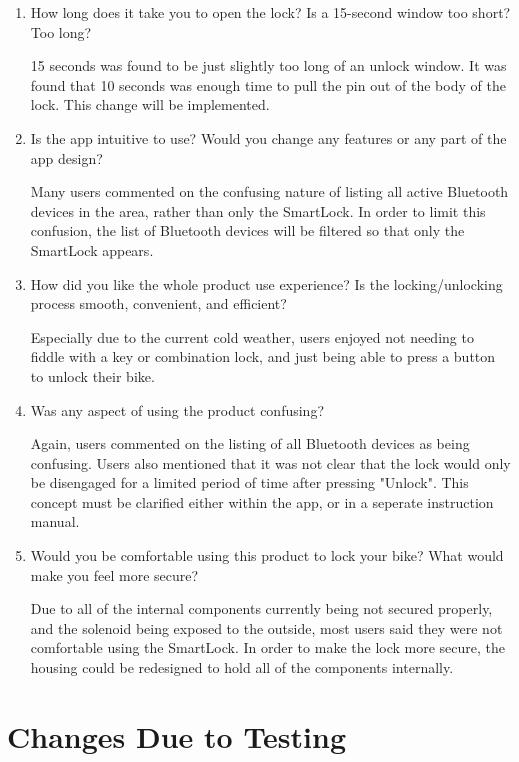 \documentclass[12pt, titlepage]{article}
\begin{document}
\begin{enumerate}
    \item How long does it take you to open the lock? Is a 15-second window too short? Too long?

    15 seconds was found to be just slightly too long of an unlock window. It was found that 10 seconds was enough time to pull the pin out of the body of the lock. This change will be implemented. 
    
    \item Is the app intuitive to use? Would you change any features or any part of the app design?

    Many users commented on the confusing nature of listing all active Bluetooth devices in the area, rather than only the SmartLock. In order to limit this confusion, the list of Bluetooth devices will be filtered so that only the SmartLock appears.
    
    \item How did you like the whole product use experience? Is the locking/unlocking process smooth, convenient, and efficient?

    Especially due to the current cold weather, users enjoyed not needing to fiddle with a key or combination lock, and just being able to press a button to unlock their bike. 
    
    \item Was any aspect of using the product confusing?

    Again, users commented on the listing of all Bluetooth devices as being confusing. Users also mentioned that it was not clear that the lock would only be disengaged for a limited period of time after pressing "Unlock". This concept must be clarified either within the app, or in a seperate instruction manual.
    
    \item Would you be comfortable using this product to lock your bike? What would make you feel more secure?

    Due to all of the internal components currently being not secured properly, and the solenoid being exposed to the outside, most users said they were not comfortable using the SmartLock. In order to make the lock more secure, the housing could be redesigned to hold all of the components internally. 
    
\end{enumerate}

\section{Changes Due to Testing}
\end{document}
